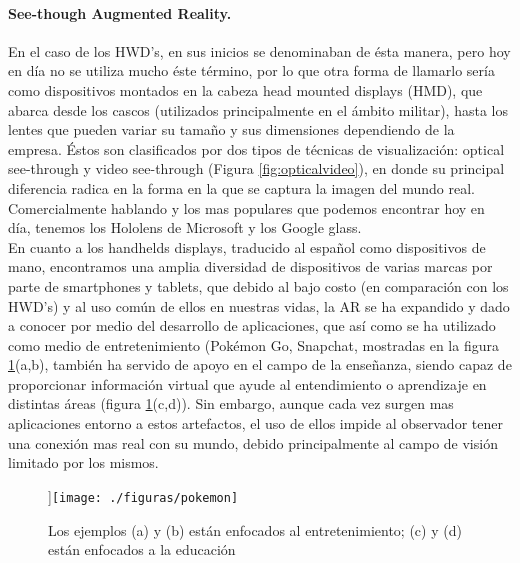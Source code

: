 \documentclass[a4paper,openright,12pt]{report}
\begin{document}
\paragraph{See-though Augmented Reality.}
En el caso de los HWD's, en sus inicios se denominaban de ésta manera, pero hoy en día no se utiliza mucho éste término, por lo que otra forma de llamarlo sería como dispositivos montados en la cabeza head mounted displays (HMD), que abarca desde los cascos (utilizados principalmente en el ámbito militar), hasta los lentes que pueden variar su tamaño y sus dimensiones dependiendo de la empresa. Éstos son clasificados por dos tipos de técnicas de visualización: optical see-through y video see-through (Figura \ref{fig:opticalvideo}), en donde su principal diferencia radica en la forma en la que se captura la imagen del mundo real. Comercialmente hablando y los mas populares que podemos encontrar hoy en día, tenemos los Hololens de Microsoft y los Google glass.\\
En cuanto a los handhelds displays, traducido al español como dispositivos de mano, encontramos una amplia diversidad de dispositivos de varias marcas por parte de smartphones y tablets, que debido al bajo costo (en comparación con los HWD's) y al uso común de ellos en nuestras vidas, la AR se ha expandido y dado a conocer por medio del desarrollo de aplicaciones, que así como se ha utilizado como medio de entretenimiento (Pokémon Go, Snapchat\textcopyright, mostradas en la figura \ref{fig:ARejemplos}(a,b), también ha servido de apoyo en el campo de la enseñanza, siendo capaz de proporcionar información virtual que ayude al entendimiento o aprendizaje en distintas áreas (figura \ref{fig:ARejemplos}(c,d)). Sin embargo, aunque cada vez surgen mas aplicaciones entorno a estos artefactos, el uso de ellos impide al observador tener una conexión mas real con su mundo, debido principalmente al campo de visión limitado por los mismos.\\
\begin{figure}[thbp]
	\centering
	\subfigure[Pokemon Go [\hyperlink{e02}{E02}] ]{\texttt{[image: ./figuras/pokemon]}}
	\caption[Ejemplos de AR en smartphones y tablets]{Los ejemplos (a) y (b) están enfocados al entretenimiento; (c) y (d) están enfocados a la educación} \label{fig:ARejemplos}
\end{figure}
\end{document}
